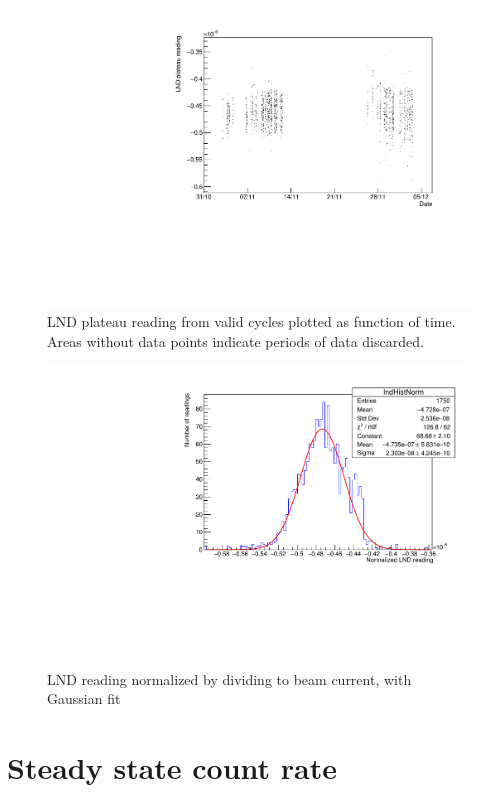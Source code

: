 \documentclass[10pt,letterpaper]{article}
\begin{document}
\begin{figure}
\centering
\includegraphics[width=\textwidth,page=1]{../thermal_neutron_detector/lndReadingOverTime.pdf}
\caption{LND plateau reading from valid cycles plotted as function of time. Areas without data points indicate periods of data discarded.}
\label{fig:LNDreadings}
\end{figure}

\begin{figure}
\centering
\includegraphics[width=\textwidth,page=1]{../thermal_neutron_detector/lndHist.pdf}
\caption{LND reading normalized by dividing to beam current, with Gaussian fit}
\label{fig:LNDhist}
\end{figure}



\section{Steady state count rate}
\end{document}
